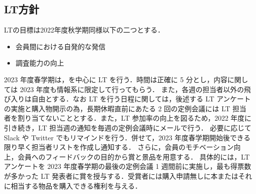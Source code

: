 \subsection*{LT方針}


LTの目標は2022年度秋学期同様以下の二つとする．
\begin{itemize}
    \item 会員間における自発的な発信
    \item 調査能力の向上
\end{itemize}
2023 年度春学期は\secondGrade{}，\thirdGrade{}を中心に LT を行う．時間は正確に 5 分とし，内容に関しては 2023 年度も情報系に限定して行ってもらう．
また，各週の担当者以外の飛び入りは自由とする．なお LT を行う日程に関しては，後述する LT アンケートの実施と購入物開示の為，長期休暇直前にあたる 2 回の定例会議には LT 担当者を割り当てないこととする．また，LT 参加率の向上を図るため，2022 年度に引き続き，LT 担当週の通知を毎週の定例会議時にメールで行う．
必要に応じて Slack や Twitter でもリマインドを行う．併せて，2023 年度春学期開始後できる限り早く担当者リストを作成し通知する．
さらに，会員のモチベーション向上，会員へのフィードバックの目的から賞と景品を用意する．
具体的には，LT アンケートを 2023 年度春学期の最後の定例会議 1 週間前に実施し，最も得票数が多かった LT 発表者に賞を授与する．受賞者には購入申請無しに本またはそれに相当する物品を購入できる権利を与える．
